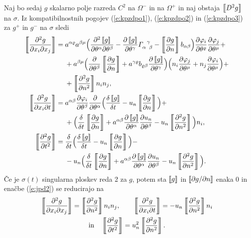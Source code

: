 Naj bo sedaj $g$ skalarno polje razreda $C^2$ na $\Omega^-$ in na $\Omega^+$ in naj
obstaja $\left\llbracket D^2g \right\rrbracket$ na $\sigma$.
Iz kompatibilnostnih pogojev (\ref{e:kpzdpo1}), (\ref{e:kpzdpo2}) in (\ref{e:kpzdpo3})
za $g^+$ in $g^-$ na $\sigma$ sledi
\begin{align}
	\jump{\frac{\partial^2 g}{\partial x_i\partial x_j}}=\;&
	a^{\alpha\varrho}a^{\beta\mu}\Big( \frac{\partial^2\jump{g}}{\partial\theta^{\alpha}\partial\theta^{\beta}}-
	\frac{\partial\jump{g}}{\partial\theta^{\gamma}}\cs{\alpha}{\gamma}{\beta}-
	\jump{\frac{\partial g}{\partial n}}b_{\alpha\beta}\Big)
	\frac{\partial\varphi_i}{\partial\theta^{\varrho}}\frac{\partial\varphi_j}{\partial\theta^{\mu}}+ \nonumber \\
	&+a^{\beta\mu}\Big(\frac{\partial}{\partial\theta^{\beta}}\jump{\frac{\partial g}{\partial n}}+
	a^{\gamma\varrho}b_{\varrho\beta}\frac{\partial\jump{g}}{\partial\theta^{\gamma}}\Big)
	\Big(n_i\frac{\partial\varphi_j}{\partial\theta^{\mu}}+n_j\frac{\partial\varphi_i}{\partial\theta^{\mu}}\Big)+
	\nonumber\\&+\jump{\frac{\partial^2 g}{\partial n^2}}n_in_j,\nonumber\\
	\jump{\frac{\partial^2 g}{\partial x_i\partial t}}=\;&
	a^{\alpha\beta}\frac{\partial\varphi_i}{\partial\theta^{\beta}}
	\frac{\partial}{\partial\theta^{\alpha}}
	\Big(\frac{\dtd \jump{g}}{\dtd t}-u_n\jump{\frac{\partial g}{\partial n}}\Big)+ \nonumber \\
	&+\Big(\frac{\dtd}{\dtd t}\jump{\frac{\partial g}{\partial n}}+
	a^{\alpha\beta}\frac{\partial\jump{g}}{\partial\theta^{\alpha}}
	\frac{\partial u_n}{\partial\theta^{\beta}}-u_n\jump{\frac{\partial^2 g}{\partial n^2}}\Big)n_i,\nonumber\\
	\jump{\frac{\partial^2 g}{\partial t^2}}=\;&
	\frac{\dtd}{\dtd t}\Big(\frac{\dtd \jump{g}}{\dtd t}-u_n\jump{\frac{\partial g}{\partial n}}\Big)- \nonumber \\
	&-u_n\Big(\frac{\dtd}{\dtd t}\jump{\frac{\partial g}{\partial n}}+
	a^{\alpha\beta}\frac{\partial\jump{g}}{\partial\theta^{\alpha}}
	\frac{\partial u_n}{\partial\theta^{\beta}}-u_n\jump{\frac{\partial^2 g}{\partial n^2}}\Big).\label{e:jpd2}
\end{align}
Če je $\sigma(t)$ singularna ploskev reda 2 za $g$, potem sta $\left\llbracket g \right\rrbracket$ in
$\left\llbracket \partial g/\partial n \right\rrbracket$ enaka 0 in enačbe (\ref{e:jpd2}) se reducirajo na
\begin{gather*}
	\left\llbracket \frac{\partial^2 g}{\partial x_i\partial x_j} \right\rrbracket=
	\left\llbracket \frac{\partial^2 g}{\partial n^2} \right\rrbracket n_in_j,\qquad
	\left\llbracket \frac{\partial^2 g}{\partial x_i\partial t} \right\rrbracket=
	-u_n\left\llbracket \frac{\partial^2 g}{\partial n^2} \right\rrbracket n_i \\ \mathrm{in}\quad
	\left\llbracket \frac{\partial^2 g}{\partial t^2} \right\rrbracket=u_n^2\left\llbracket \frac{\partial^2 g}{\partial n^2} \right\rrbracket.
\end{gather*}

